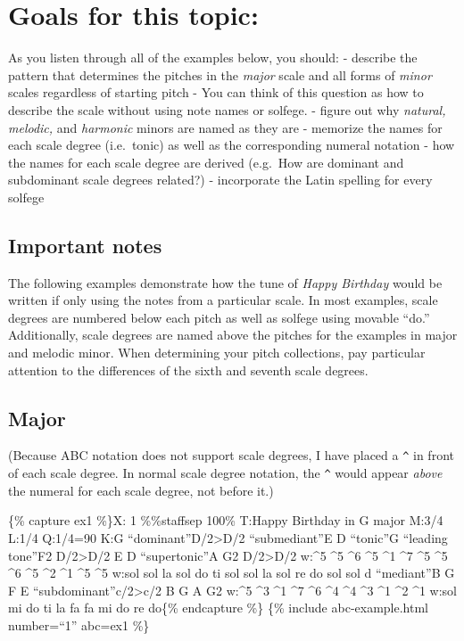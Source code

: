 \documentclass{book}
\begin{document}
\hypertarget{goals-for-this-topic-3}{%
\section{Goals for this topic:}\label{goals-for-this-topic-3}}

As you listen through all of the examples below, you should: - describe the
pattern that determines the pitches in the \emph{major} scale and all forms of
\emph{minor} scales regardless of starting pitch - You can think of this
question as how to describe the scale without using note names or solfege. -
figure out why \emph{natural, melodic,} and \emph{harmonic} minors are named
as they are - memorize the names for each scale degree (i.e.~tonic) as well as
the corresponding numeral notation - how the names for each scale degree are
derived (e.g.~How are dominant and subdominant scale degrees related?) -
incorporate the Latin spelling for every solfege

\hypertarget{important-notes}{%
\subsection{Important notes}\label{important-notes}}

The following examples demonstrate how the tune of \emph{Happy Birthday} would
be written if only using the notes from a particular scale. In most examples,
scale degrees are numbered below each pitch as well as solfege using movable
``do.'' Additionally, scale degrees are named above the pitches for the
examples in major and melodic minor. When determining your pitch collections,
pay particular attention to the differences of the sixth and seventh scale
degrees.

\hypertarget{major}{%
\subsection{Major}\label{major}}

(Because ABC notation does not support scale degrees, I have placed a
\texttt{\^{}} in front of each scale degree. In normal scale degree notation,
the \texttt{\^{}} would appear \emph{above} the numeral for each scale degree,
not before it.)

\{\% capture ex1 \%\}X: 1 \%\%staffsep 100\% T:Happy Birthday in G major M:3/4
L:1/4 Q:1/4=90 K:G ``dominant''D/2\textgreater D/2\textbar{} ``submediant''E D
``tonic''G\textbar{} ``leading tone''F2 D/2\textgreater D/2\textbar{} E D
``supertonic''A\textbar{} G2 D/2\textgreater D/2\textbar{} w:\^{}5 \^{}5 \^{}6
\^{}5 \^{}1 \^{}7 \^{}5 \^{}5 \^{}6 \^{}5 \^{}2 \^{}1 \^{}5 \^{}5 w:sol sol la
sol do ti sol sol la sol re do sol sol d ``mediant''B G\textbar{} F E
``subdominant''c/2\textgreater c/2\textbar{} B G A\textbar{} G2\textbar{]}
w:\^{}5 \^{}3 \^{}1 \^{}7 \^{}6 \^{}4 \^{}4 \^{}3 \^{}1 \^{}2 \^{}1 w:sol mi
do ti la fa fa mi do re do\{\% endcapture \%\} \{\% include abc-example.html
number=``1'' abc=ex1 \%\}
\end{document}
